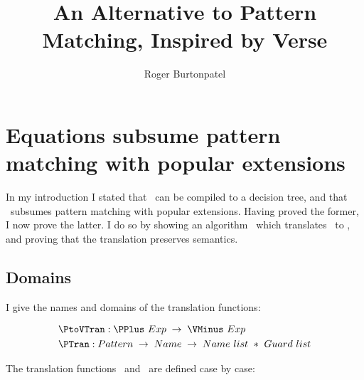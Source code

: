 \documentclass[manuscript,screen,review, 12pt, nonacm]{acmart}
\title{An Alternative to Pattern Matching, Inspired by Verse}
\author{Roger Burtonpatel}
\affiliation{%
\institution{Tufts University}
\streetaddress{419 Boston Ave}
  \city{Medford}
  \state{Massachusetts}
  \country{USA}
  \postcode{02155}
  }
\begin{document}
\section{Equations subsume pattern matching with popular extensions}
\label{pplustovminus}
    In my introduction I stated that \VMinus\ can be compiled to a decision
    tree, and that \VMinus\ subsumes pattern matching with popular extensions.
    Having proved the former, I now prove the latter. I do so by showing an
    algorithm \PtoVTran\ which translates \PPlus\ to \VMinus, and proving that
    the translation preserves semantics. 

    \subsection{Domains}

    I give the names and domains of the translation functions: 
    
    \begin{align*}
        &\PtoVTran: \PPlus\ Exp\; \rightarrow\; \VMinus\ Exp \\
        &\PTran: Pattern\; \rightarrow\; Name\; \rightarrow\; Name\ list\ *\ Guard\ list \\
    \end{align*}
    
    The translation functions \PtoVTran\ and \PTran\ are defined case by case: 
    
    
        
\end{document}
